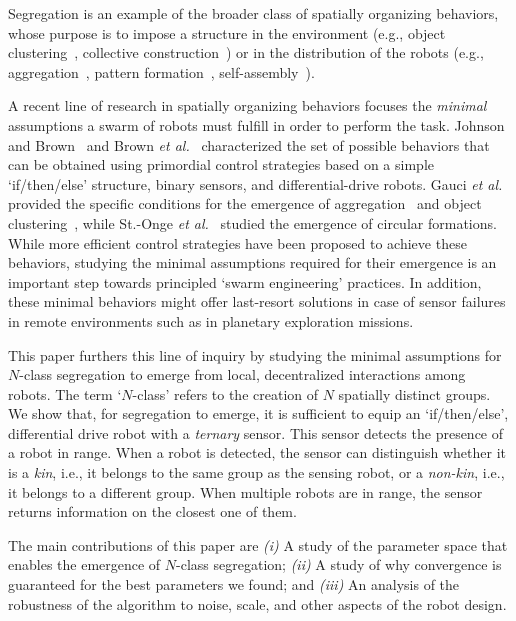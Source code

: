 \documentclass[letterpaper, 10 pt, conference]{ieeeconf}
\begin{document}
Segregation is an example of the broader class of spatially organizing
behaviors, whose purpose is to impose a structure in the environment (e.g.,
object clustering~\cite{gauci_clustering_2014}, collective
construction~\cite{Bolger2010}) or in the distribution of the robots (e.g.,
aggregation~\cite{shlyakhov_survey_2017}, pattern
formation~\cite{Pinciroli:DARS2016}, self-assembly~\cite{gross2008self}).

A recent line of research in spatially organizing behaviors focuses the
\emph{minimal} assumptions a swarm of robots must fulfill in order to perform the
task. Johnson and Brown~\cite{johnson_evolving_2016} and Brown \emph{et
  al.}~\cite{brown_discovery_2018} characterized the set of possible behaviors
that can be obtained using primordial control strategies based on a simple
`if/then/else' structure, binary sensors, and differential-drive robots. Gauci
\emph{et al.} provided the specific conditions for the emergence of
aggregation~\cite{gauci_evolving_2014} and object
clustering~\cite{gauci_clustering_2014}, while St.-Onge \emph{et
  al.}~\cite{StOnge:IROS2018} studied the emergence of circular
formations. While more efficient control strategies have been proposed to
achieve these behaviors, studying the minimal assumptions required for their emergence is
an important step towards principled `swarm engineering' practices. In addition,
these minimal behaviors might offer last-resort solutions in case of sensor
failures in remote environments such as in planetary exploration missions.

This paper furthers this line of inquiry by studying the minimal assumptions for
$N$-class segregation to emerge from local, decentralized interactions among
robots. The term `$N$-class' refers to the creation of $N$ spatially distinct
groups. We show that, for segregation to emerge, it is sufficient to equip an
`if/then/else', differential drive robot with a \emph{ternary} sensor. This
sensor detects the presence of a robot in range. When a robot is detected, the
sensor can distinguish whether it is a \emph{kin}, i.e., it belongs to the same
group as the sensing robot, or a \emph{non-kin}, i.e., it belongs to a different
group. When multiple robots are in range, the sensor returns information on the
closest one of them.

The main contributions of this paper are \emph{(i)} A study of the parameter
space that enables the emergence of $N$-class segregation; \emph{(ii)} A study
of why convergence is guaranteed for the best parameters we found; and
\emph{(iii)} An analysis of the robustness of the algorithm to noise, scale,
and other aspects of the robot design.
\end{document}
